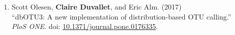 \documentclass[10pt]{article}
\makeatletter
\newlength{\bibhang}
\newlength{\bibsep}
 {\@listi \global\bibsep\itemsep \global\advance\bibsep by\parsep}
\newenvironment{bibsection}%
        {\begin{enumerate}{}{%
       \setlength{\leftmargin}{\bibhang}%
       \setlength{\itemindent}{-\leftmargin}%
       \setlength{\itemsep}{\bibsep}%
       \setlength{\parsep}{\z@}%
        \setlength{\partopsep}{0pt}%
        \setlength{\topsep}{0pt}}}
        {\end{enumerate}\vspace{-.6\baselineskip}}
\makeatother
\begin{document}
\begin{bibsection}
	\item Scott Olesen, \textbf{Claire Duvallet}, and Eric Alm. (2017) \\ 
		``dbOTU3: A new implementation of distribution-based OTU calling.'' \\ 
		\emph{PloS ONE}. doi: \href{https://doi.org/10.1371/journal.pone.0176335}{10.1371/journal.pone.0176335}. \\

%
%
%
%
%	
%
%		
%		

\end{bibsection}
\end{document}
